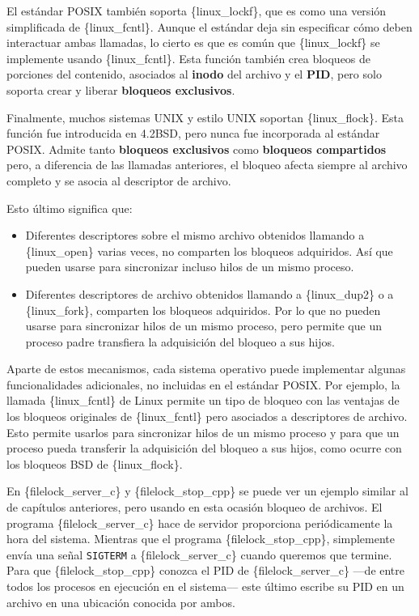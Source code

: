 El estándar POSIX también soporta \{linux\_lockf\}, que es como una
versión simplificada de \{linux\_fcntl\}. Aunque el estándar deja sin
especificar cómo deben interactuar ambas llamadas, lo cierto es que es
común que \{linux\_lockf\} se implemente usando \{linux\_fcntl\}. Esta
función también crea bloqueos de porciones del contenido, asociados al
\textbf{inodo} del archivo y el \textbf{PID}, pero solo soporta crear y
liberar \textbf{bloqueos exclusivos}.

Finalmente, muchos sistemas UNIX y estilo UNIX soportan
\{linux\_flock\}. Esta función fue introducida en 4.2BSD, pero nunca fue
incorporada al estándar POSIX. Admite tanto \textbf{bloqueos exclusivos}
como \textbf{bloqueos compartidos} pero, a diferencia de las llamadas
anteriores, el bloqueo afecta siempre al archivo completo y se asocia al
descriptor de archivo.

Esto último significa que:

\begin{itemize}
\item
  Diferentes descriptores sobre el mismo archivo obtenidos llamando a
  \{linux\_open\} varias veces, no comparten los bloqueos adquiridos.
  Así que pueden usarse para sincronizar incluso hilos de un mismo
  proceso.
\item
  Diferentes descriptores de archivo obtenidos llamando a
  \{linux\_dup2\} o a \{linux\_fork\}, comparten los bloqueos
  adquiridos. Por lo que no pueden usarse para sincronizar hilos de un
  mismo proceso, pero permite que un proceso padre transfiera la
  adquisición del bloqueo a sus hijos.
\end{itemize}

Aparte de estos mecanismos, cada sistema operativo puede implementar
algunas funcionalidades adicionales, no incluidas en el estándar POSIX.
Por ejemplo, la llamada \{linux\_fcntl\} de Linux permite un tipo de
bloqueo con las ventajas de los bloqueos originales de \{linux\_fcntl\}
pero asociados a descriptores de archivo. Esto permite usarlos para
sincronizar hilos de un mismo proceso y para que un proceso pueda
transferir la adquisición del bloqueo a sus hijos, como ocurre con los
bloqueos BSD de \{linux\_flock\}.

En \{filelock\_server\_c\} y \{filelock\_stop\_cpp\} se puede ver un
ejemplo similar al de capítulos anteriores, pero usando en esta ocasión
bloqueo de archivos. El programa \{filelock\_server\_c\} hace de
servidor proporciona periódicamente la hora del sistema. Mientras que el
programa \{filelock\_stop\_cpp\}, simplemente envía una señal
\texttt{SIGTERM} a \{filelock\_server\_c\} cuando queremos que termine.
Para que \{filelock\_stop\_cpp\} conozca el PID de
\{filelock\_server\_c\} ---de entre todos los procesos en ejecución en
el sistema--- este último escribe su PID en un archivo en una ubicación
conocida por ambos.

